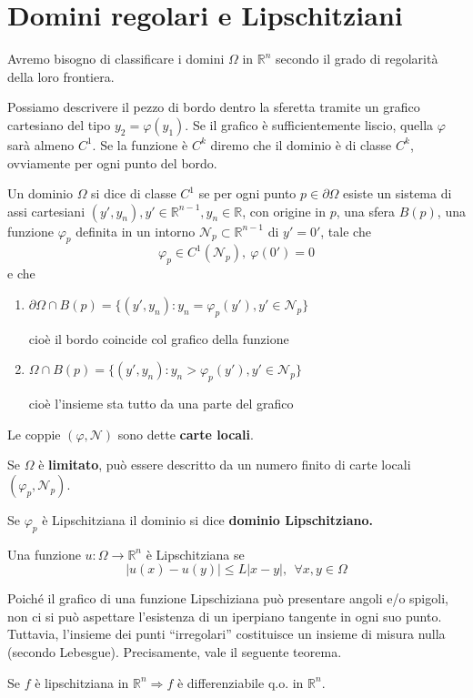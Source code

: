 \documentclass[10pt,a4paper,twoside,openright]{book}
\begin{document}
\section{Domini regolari e Lipschitziani}

Avremo bisogno di classificare i domini $\Omega $ in $\mathbb{R}^{n}$ secondo il grado di regolarità della loro frontiera.

Possiamo descrivere il pezzo di bordo dentro la sferetta tramite un grafico cartesiano del tipo $y_{2} =\varphi (y_{1})$. Se il grafico è sufficientemente liscio, quella $\varphi $ sarà almeno $C^{1}$. Se la funzione è $C^{k}$ diremo che il dominio è di classe $C^{k}$, ovviamente per ogni punto del bordo.


\begin{definition}
	Un dominio $\Omega $ si dice di classe $C^{1}$ se per ogni punto $p\in \partial \Omega $ esiste un sistema di assi cartesiani $(y',y_{n}),y'\in \mathbb{R}^{n-1},y_{n} \in \mathbb{R}$, con origine in $p$, una sfera $B(p)$, una funzione $\varphi _{p}$ definita in un intorno $\mathcal{N}_{p} \subset \mathbb{R}^{n-1}$ di $y'=0'$, tale che
	\begin{equation*}
	\varphi _{p} \in C^{1}(\mathcal{N}_{p}),\ \varphi (0') =0
	\end{equation*}
	e che
	\begin{enumerate}
	\item $\partial \Omega \cap B(p) =\{(y',y_{n}) :y_{n} =\varphi _{p}(y'),y'\in \mathcal{N}_{p}\}$

	cioè il bordo coincide col grafico della funzione
	\item $\Omega \cap B(p) =\{(y',y_{n}) :y_{n}  >\varphi _{p}(y'),y'\in \mathcal{N}_{p}\}$

	cioè l'insieme sta tutto da una parte del grafico
	\end{enumerate}
\end{definition}

Le coppie $( \varphi,\mathcal{N})$ sono dette \textbf{carte locali}.

Se $\Omega $ è \textbf{limitato}, può essere descritto da un numero finito di carte locali $( \varphi _{p},\mathcal{N}_{p})$.

Se $\varphi _{p}$ è Lipschitziana il dominio si dice \textbf{dominio Lipschitziano.}
\begin{definition}
 Una funzione $u:\Omega \rightarrow \mathbb{R}^{n}$ è Lipschitziana se
\begin{equation*}
| u(x) -u(y)| \leqslant L| x-y|,\ \ \forall x,y\in \Omega 
\end{equation*}
\end{definition}
Poiché il grafico di una funzione Lipschiziana può presentare angoli e/o spigoli, non ci si può aspettare l’esistenza di un iperpiano tangente in ogni suo punto. Tuttavia, l’insieme dei punti ``irregolari'' costituisce un insieme di misura nulla (secondo Lebesgue). Precisamente, vale il seguente teorema.
\begin{theorem}
[di Rademacher] Se $f$ è lipschitziana in $\mathbb{R}^{n} \Rightarrow f$ è differenziabile q.o. in $\mathbb{R}^{n}$.
\end{theorem}
\end{document}
